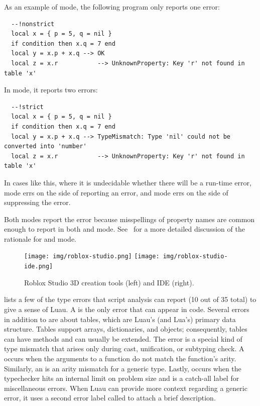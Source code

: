 \documentclass[english,submission,cleveref]{programming}
\begin{document}
As an example of \mnonstrict{} mode, the following program only reports one error:
\begin{verbatim}
  --!nonstrict
  local x = { p = 5, q = nil }
  if condition then x.q = 7 end
  local y = x.p + x.q --> OK
  local z = x.r           --> UnknownProperty: Key 'r' not found in table 'x'
\end{verbatim}
In \mstrict{} mode, it reports two errors:
\begin{verbatim}
  --!strict
  local x = { p = 5, q = nil }
  if condition then x.q = 7 end
  local y = x.p + x.q --> TypeMismatch: Type 'nil' could not be converted into 'number'
  local z = x.r           --> UnknownProperty: Key 'r' not found in table 'x'
\end{verbatim}
In cases like this, where it is undecidable whether there will be a run-time error,
\mstrict{} mode errs on the side of reporting an error, and \mnonstrict{} mode errs on
the side of suppressing the error.

Both modes report the  error because
misspellings of property names are common enough to report in both
\mstrict{} and \mnonstrict{} mode. See~\cite{bfj-hatra-2021}
for a more detailed discussion of the rationale for \mstrict{} and
\mnonstrict{} mode.

\begin{figure}[t]\centering
  \texttt{[image: img/roblox-studio.png]}
  \texttt{[image: img/roblox-studio-ide.png]}
  \caption{{Roblox Studio 3D creation} tools (left) and IDE (right).}
  \label{fig:roblox-studio}
\end{figure}

 lists a few of the type errors that
script analysis can report (10 out of 35 total)
to give a sense of Luau.
A  is the only error that can appear in
\mnocheck{} code.
Several errors in addition to  are about
tables, which are Luau's (and Lua's) primary data structure.
Tables support arrays, dictionaries, and objects; consequently,
tables can have methods and can usually be extended.
The error  is a special kind of type mismatch
that arises only during cast, unification, or subtyping check.
A  occurs when the arguments to a function
do not match the function's arity.
Similarly, an  is an arity mismatch
for a generic type.
Lastly,  occurs when the typechecker hits an
internal limit on problem size and  is a catch-all
label for miscellaneous errors.
When Luau can provide more context regarding a generic error, it uses
a second error label called  to attach
a brief description.
\end{document}
